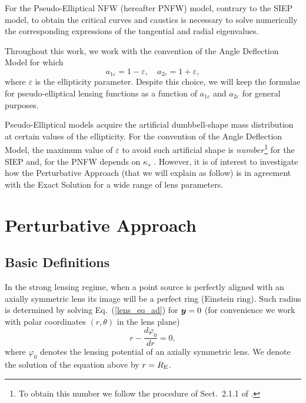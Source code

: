 \documentclass[useAMS,usenatbib]{mn2e}
\begin{document}
For the Pseudo-Elliptical NFW (hereafter PNFW) model, contrary to the SIEP model, to obtain the critical curves and caustics is necessary to solve numerically the corresponding expressions of the tangential and radial eigenvalues.

Throughout this work, we work with the convention of the Angle Deflection Model \citep{gk02} for which
\begin{equation}
a_{1\varepsilon}=1-\varepsilon, \quad a_{2\varepsilon}=1+\varepsilon, \label{gk_par}
\end{equation}
where $\varepsilon$ is the ellipticity parameter. Despite this choice, we will keep the formulae for pseudo-elliptical lensing functions as a function of $a_{1\varepsilon}$ and $a_{2\varepsilon}$ for general purposes.

Pseudo-Elliptical models acquire the artificial dumbbell-shape mass distribution at certain values of the ellipticity. For the convention of the Angle Deflection Model, the maximum value of $\varepsilon$ to avoid such artificial shape is $number$\footnote{To obtain this number we follow the procedure of Sect.~2.1.1 of \citet{dm_2011}.} for the SIEP and, for the PNFW depends on $\kappa_s$ \citep{dm_2011}. However, it is of interest to investigate how the Perturbative Approach (that we will explain as follow) is in agreement with the Exact Solution for a wide range of lens parameters.

\section{Perturbative Approach}
\label{pert_appro_sec}
\subsection{Basic Definitions}

In the strong lensing regime, when a point source is perfectly aligned with an axially symmetric lens its image will be a perfect ring (Einstein ring). Such radius is determined by solving Eq.~(\ref{lens_eq_ad}) for $\bmath{y}=0$ (for convenience we work with polar coordinates $(r,\theta)$ in the lens plane)
\[
r-\frac{d\varphi_0}{d r}=0,
\]
where $\varphi_0$ denotes the lensing potential of an axially symmetric lens. We denote the solution of the equation above by $r=R_{\rm E}$.
\end{document}
